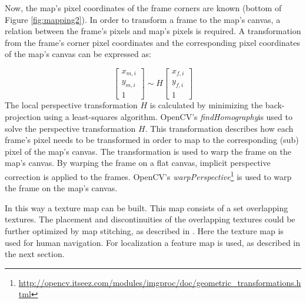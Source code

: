 Now, the map's pixel coordinates of the frame corners are known (bottom of Figure \ref{fig:mapping2}).
In order to transform a frame to the map's canvas, a relation between the frame's pixels and map's pixels is required.
A transformation from the frame's corner pixel coordinates and the corresponding pixel coordinates of the map's canvas can be expressed as:

\begin{equation}
\label{eq:visual-slam-perspective-transformation}
\left[ {
\begin{array}{c} x_{m,i} \\ y_{m,i} \\ 1 \end{array}
} \right]
\sim
H
\left[ {
\begin{array}{c} x_{f,i} \\ y_{f,i} \\ 1 \end{array}
} \right]
\end{equation}
The local perspective transformation $H$ is calculated by minimizing the back-projection using a least-squares algorithm.
OpenCV's \textit{findHomography}\footnotemark[3] is used to solve the perspective transformation $H$.
This transformation describes how each frame's pixel needs to be transformed in order to map to the \mbox{corresponding} (sub) pixel of the map's canvas.
The transformation is used to warp the frame on the map's canvas.
By warping the frame on a flat canvas, implicit perspective correction is applied to the frames.
OpenCV's \textit{warpPerspective}\footnote{\url{http://opencv.itseez.com/modules/imgproc/doc/geometric_transformations.html}} is used to warp the frame on the map's canvas.

In this way a texture map can be built. This map consists of a set overlapping textures. The placement and discontinuities of the overlapping textures could be further optimized by map stitching, as described in \cite{Visser2011imav}. Here the texture map is used for human navigation.
For
localization a feature map is used, as described in the next section.



